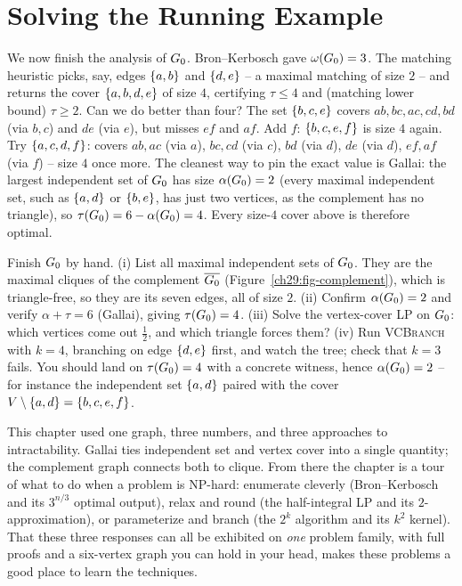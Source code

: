 \section{Solving the Running Example}
\label{ch29:wrapup}

We now finish the analysis of $G_0$. Bron--Kerbosch gave $\omega(G_0)=3$. The matching
heuristic picks, say, edges $\{a,b\}$ and $\{d,e\}$ -- a maximal matching of
size $2$ -- and returns the cover $\{a,b,d,e\}$ of size $4$, certifying
$\tau\le4$ and (matching lower bound) $\tau\ge2$. Can we do better than four? The
set $\{b,c,e\}$ covers $ab,bc,ac,cd,bd$ (via $b,c$) and $de$ (via $e$), but
misses $ef$ and $af$. Add $f$: $\{b,c,e,f\}$ is size $4$ again. Try
$\{a,c,d,f\}$: covers $ab,ac$ (via $a$), $bc,cd$ (via $c$), $bd$ (via $d$),
$de$ (via $d$), $ef,af$ (via $f$) -- size $4$ once more. The cleanest way to pin
the exact value is Gallai: the largest independent set of $G_0$ has size
$\alpha(G_0)=2$ (every maximal independent set, such as $\{a,d\}$ or
$\{b,e\}$, has just two vertices, as the complement has no triangle), so
$\tau(G_0)=6-\alpha(G_0)=4$. Every size-$4$ cover above is therefore
optimal.

\begin{labbox}
Finish $G_0$ by hand. (i) List all maximal independent sets of $G_0$. They are
the maximal cliques of the complement $\overline{G_0}$
(Figure~\ref{ch29:fig-complement}), which is triangle-free, so they are its seven
edges, all of size $2$. (ii) Confirm $\alpha(G_0)=2$ and verify $\alpha+\tau=6$ (Gallai),
giving $\tau(G_0)=4$. (iii) Solve the vertex-cover LP on $G_0$: which
vertices come out $\tfrac12$, and which triangle forces them? (iv) Run
\textsc{VCBranch} with $k=4$, branching on edge $\{d,e\}$ first, and watch the
tree; check that $k=3$ fails. You should land on $\tau(G_0)=4$ with a concrete
witness, hence $\alpha(G_0)=2$ -- for instance the independent set $\{a,d\}$
paired with the cover $V\setminus\{a,d\}=\{b,c,e,f\}$.
\end{labbox}

\begin{aestheticbox}
This chapter used one graph, three numbers, and three approaches to intractability. Gallai
ties independent set and vertex cover into a single quantity; the complement
graph connects both to clique. From there the chapter is a tour of what to do when a
problem is NP-hard: enumerate cleverly (Bron--Kerbosch and its $3^{n/3}$ optimal
output), relax and round (the half-integral LP and its $2$-approximation), or
parameterize and branch (the $2^k$ algorithm and its $k^2$ kernel). That these
three responses can all be exhibited on \emph{one} problem family, with full
proofs and a six-vertex graph you can hold in your head, makes these problems a good
place to learn the techniques.
\end{aestheticbox}


